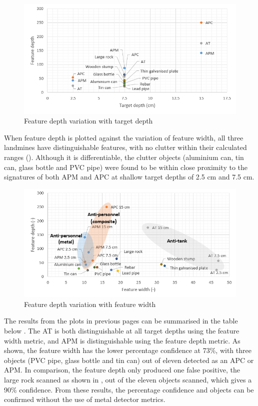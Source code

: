 \documentclass[main.tex]{subfiles}
\begin{document}
\begin{figure}[!ht]
\includegraphics[width=\textwidth]{5-Testing/featureDepth.PNG}
\centering
\caption{Feature depth variation with target depth}
\end{figure}

When feature depth is plotted against the variation of feature width, all three landmines have distinguishable features, with no clutter within their calculated ranges (). Although it is differentiable, the clutter objects (aluminium can, tin can, glass bottle and PVC pipe) were found to be within close proximity to the signatures of both APM and APC at shallow target depths of 2.5 cm and 7.5 cm.

\begin{figure}[!ht]
\includegraphics[width=\textwidth]{5-Testing/depthWidth.PNG}
\centering
\caption{Feature depth variation with feature width}
\end{figure}

The results from the plots in previous pages can be summarised in the table below . The AT is both distinguishable at all target depths using the feature width metric, and APM is distinguishable using the feature depth metric. As shown, the feature width has the lower percentage confidence at 73\%, with three objects (PVC pipe, glass bottle and tin can) out of eleven detected as an APC or APM. In comparison, the feature depth only produced one false positive, the large rock scanned as shown in , out of the eleven objects scanned, which gives a 90\% confidence. From these results, the percentage confidence and objects can be confirmed without the use of metal detector metrics. 
\end{document}
